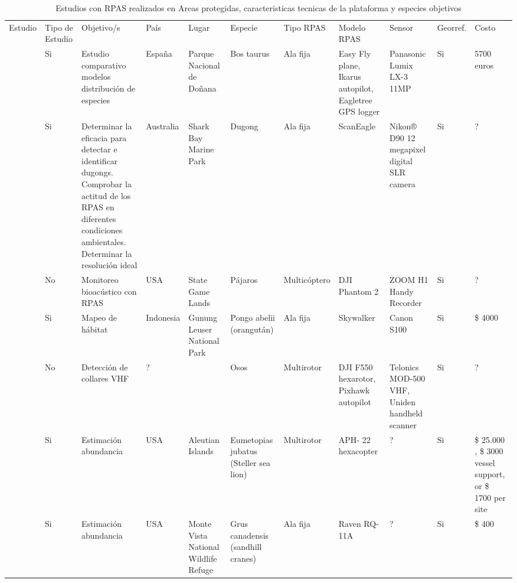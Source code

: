 \documentclass[11pt,]{article}
\begin{document}
\begin{sidewaystable}
\centering
\captionsetup{font=scriptsize,labelfont=scriptsize}
\caption{Estudios con RPAS realizados en Areas protegidas, caracteristicas tecnicas de la plataforma y especies objetivos}
\label{my-label}
\tiny
\begin{tabular}{p{2.5cm}p{1cm}p{3cm}p{1cm}p{2cm}p{2cm}p{1cm}p{2cm}p{2cm}p{1cm}p{0.5cm}}
\cmidrule(r){1-11}

Estudio & Tipo de Estudio & Objetivo/s & País & Lugar & Especie & Tipo RPAS & Modelo RPAS & Sensor & Georref. & Costo \\ \cmidrule(r){1-11}


\cite{PazmanyMulero2015}  & Si & Estudio comparativo modelos distribución de especies & España & Parque Nacional de Doñana & Bos taurus  & Ala fija & Easy Fly plane, Ikarus autopilot, Eagletree GPS logger & Panasonic Lumix LX-3 11MP & Si & 
5700 euros \\ 

\citealt{Hodgson2013} & Si & Determinar la eficacia para detectar e identificar dugongs.  Comprobar la actitud de los RPAS en diferentes condiciones ambientales. Determinar la resolución ideal  & Australia & Shark Bay Marine Park & Dugong & Ala fija &  ScanEagle & Nikon® D90 12 megapixel digital SLR camera  & Si & ?  \\ 


\cite{Wilson2017}  & No & Monitoreo bioacústico con RPAS & USA & State Game Lands & Pájaros  & Multicóptero & DJI Phantom 2 & ZOOM H1 Handy Recorder  & Si & ? \\ 

\cite{Szantoi2017}  & Si & Mapeo de hábitat & Indonesia & Gunung Leuser National Park & Pongo abelii (orangután)  & Ala fija & Skywalker & Canon S100  & Si & \$ 4000 \\ 


\cite{Bayram2016}  &  No & Detección de collares VHF & ? & & Osos  & Multirotor & DJI F550 hexarotor, Pixhawk autopilot & Telonics MOD-500 VHF, Uniden handheld scanner  & Si & ? \\ 

\cite{Christie2016}  &  Si  & Estimación abundancia & USA &  Aleutian Islands & Eumetopias jubatus (Steller sea lion)  & Multirotor & APH- 22 hexacopter & ?  & Si & \$ 25.000 , \$ 3000 vessel support, or \$ 1700 per site \\ 

\cite{Christie2016}  &  Si & Estimación abundancia & USA &  Monte Vista National Wildlife Refuge
 & Grus canadensis (sandhill cranes)  & Ala fija & Raven RQ- 11A & ?  & Si & \$ 400 \\ 


\end{tabular}
\end{sidewaystable}
\end{document}
